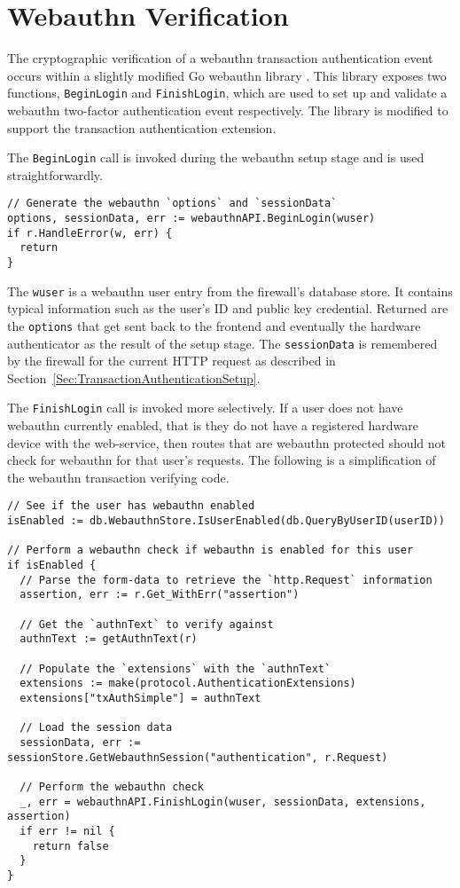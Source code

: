 \section{Webauthn Verification}\label{Sec:WebauthnVerification}

The cryptographic verification of a webauthn transaction authentication event occurs within a slightly modified Go webauthn library \cite{TODO-Golang-Webauthn-Library}. This library exposes two functions, \lstinline{BeginLogin} and \lstinline{FinishLogin}, which are used to set up and validate a webauthn two-factor authentication event respectively. The library is modified to support the transaction authentication extension.

The \lstinline{BeginLogin} call is invoked during the webauthn setup stage and is used straightforwardly.

\begin{lstlisting}
// Generate the webauthn `options` and `sessionData`
options, sessionData, err := webauthnAPI.BeginLogin(wuser)
if r.HandleError(w, err) {
  return
}

\end{lstlisting}

The \lstinline{wuser} is a webauthn user entry from the firewall's database store. It contains typical information such as the user's ID and public key credential. Returned are the \lstinline{options} that get sent back to the frontend and eventually the hardware authenticator as the result of the setup stage. The \lstinline{sessionData} is remembered by the firewall for the current HTTP request as described in Section~\ref{Sec:TransactionAuthenticationSetup}.

The \lstinline{FinishLogin} call is invoked more selectively. If a user does not have webauthn currently enabled, that is they do not have a registered hardware device with the web-service, then routes that are webauthn protected should not check for webauthn for that user's requests. The following is a simplification of the webauthn transaction verifying code.

\begin{lstlisting}
// See if the user has webauthn enabled
isEnabled := db.WebauthnStore.IsUserEnabled(db.QueryByUserID(userID))

// Perform a webauthn check if webauthn is enabled for this user
if isEnabled {
  // Parse the form-data to retrieve the `http.Request` information
  assertion, err := r.Get_WithErr("assertion")

  // Get the `authnText` to verify against
  authnText := getAuthnText(r)

  // Populate the `extensions` with the `authnText`
  extensions := make(protocol.AuthenticationExtensions)
  extensions["txAuthSimple"] = authnText

  // Load the session data
  sessionData, err := sessionStore.GetWebauthnSession("authentication", r.Request)

  // Perform the webauthn check
  _, err = webauthnAPI.FinishLogin(wuser, sessionData, extensions, assertion)
  if err != nil {
    return false
  }
}
\end{lstlisting}

